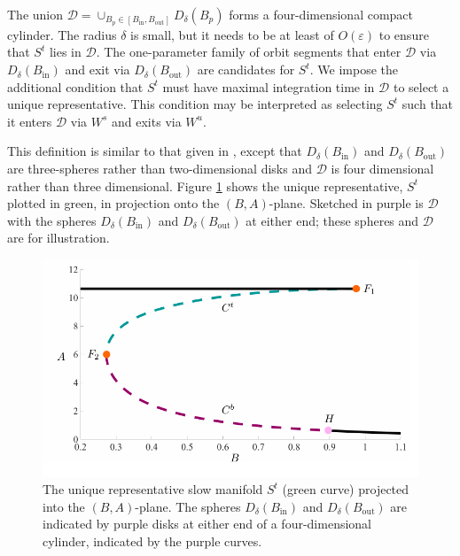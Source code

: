 \documentclass{ws-ijbc}
\begin{document}
\noindent
The union $\mathscr{D} = \cup_{B_p \in [B_{\mathrm{in}}, B_{\mathrm{out}}]} D_\delta(B_p)$ forms a four-dimensional compact cylinder.  The radius $\delta$ is small, but it needs to be at least of $O(\varepsilon)$ to ensure that $S^t$ lies in $\mathscr{D}$.  The one-parameter family of orbit segments that enter $\mathscr{D}$ via $D_\delta(B_{\mathrm{in}})$ and exit via $D_\delta(B_{\mathrm{out}})$ are candidates for $S^t$.   We impose the additional condition that $S^t$ must have maximal integration time in $\mathscr{D}$ to select a unique representative.  This condition may be interpreted as selecting $S^t$ such that it enters $\mathscr{D}$ via $W^s$ and exits via $W^u$.
    
This definition is similar to that given in \cite{Saeed_Paper}, except that $D_\delta(B_{\mathrm{in}})$ and $D_\delta(B_{\mathrm{out}})$ are three-spheres rather than two-dimensional disks and $\mathscr{D}$ is four dimensional rather than three dimensional.  Figure \ref{tube_figure} shows the unique representative, $S^t$ plotted in green, in projection onto the $(B,A)$-plane.  Sketched in purple is $\mathscr{D}$ with the spheres $D_\delta(B_{\mathrm{in}})$ and $D_\delta(B_{\mathrm{out}})$ at either end; these spheres and $\mathscr{D}$ are for illustration.

\begin{figure}[!t]
\begin{center}
\includegraphics[page=2, width=\textwidth]{figures.pdf}
\end{center}
\caption{The unique representative slow manifold $S^t$ (green curve) projected into the $(B,A)$-plane.  The spheres $D_\delta(B_{\mathrm{in}})$ and $D_\delta(B_{\mathrm{out}})$ are indicated by purple disks at either end of a four-dimensional cylinder, indicated by the purple curves.}
\label{tube_figure}
\end{figure}
\end{document}
